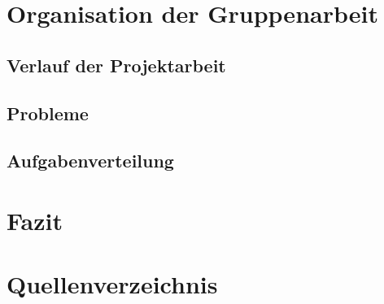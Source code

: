 \documentclass[12pt]{report}
\begin{document}
    \chapter{Organisation der Gruppenarbeit}

    \section{Verlauf der Projektarbeit}

    \section{Probleme}

    \section{Aufgabenverteilung}


    \chapter{Fazit}

    \chapter{Quellenverzeichnis}
    
\end{document}
